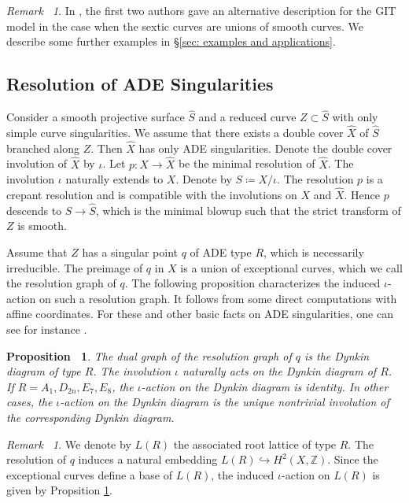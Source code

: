 \documentclass[12pt,reqno,a4paper]{amsart}
\newtheorem{prop}[thm]{Proposition~}
\theoremstyle{remark}
\newtheorem{rmk}[thm]{Remark~}
\theoremstyle{definition}
\begin{document}
\begin{rmk}
In \cite[\S4.2]{yu2023moduli}, the first two authors gave an alternative description for the GIT model in the case when the sextic curves are unions of smooth curves.
We describe some further examples in \S \ref{sec: examples and applications}.
\end{rmk}


\subsection{Resolution of ADE Singularities}
\label{subsection: resolution of ADE}










Consider a smooth projective surface $\widehat{S}$ and a reduced curve $Z\subset \widehat{S}$ with only simple curve singularities.
We assume that there exists a double cover $\widehat{X}$ of $\widehat{S}$ branched along $Z$. Then $\widehat{X}$ has only ADE singularities.
Denote the double cover involution of $\widehat{X}$ by $\iota$. 
Let $p\colon X \to \widehat{X}$ be the minimal resolution of $\widehat{X}$.
The involution $\iota$ naturally extends to $X$.
Denote by $S\coloneqq X/\iota$.
The resolution $p$ is a crepant resolution and is compatible with the involutions on $X$ and $\widehat{X}$. Hence $p$ descends to $S\to \widehat{S}$, which is the minimal blowup such that the strict transform of $Z$ is smooth.


Assume that $Z$ has a singular point $q$ of ADE type $R$, which is necessarily irreducible.
The preimage of $q$ in $X$ is a union of exceptional curves, which we call the resolution graph of $q$. 
The following proposition characterizes the induced $\iota$-action on such a resolution graph. It follows from some direct computations with affine coordinates. For these and other basic facts on ADE singularities, one can see for instance \cite[III, \S 7]{barth2004compact}.
\begin{prop}
\label{prop: iota-action on resolution graph/base}
  The dual graph of the resolution graph of $q$ is the Dynkin diagram of type $R$. 
  The involution $\iota$ naturally acts on the Dynkin diagram of $R$.
  If $R=A_1, D_{2n}, E_7, E_8$, the $\iota$-action on the Dynkin diagram is identity. 
  In other cases, the $\iota$-action on the Dynkin diagram is the unique nontrivial involution of the corresponding Dynkin diagram.
\end{prop}
\begin{rmk}
\label{rmk: iota-action on L(R)}
    We denote by $L(R)$ the associated root lattice of type $R$.
    The resolution of $q$ induces a natural embedding $L(R)\hookrightarrow H^2(X,\mathbb{Z})$.
    Since the exceptional curves define a base of $L(R)$, the induced $\iota$-action on $L(R)$ is given by Propsition \ref{prop: iota-action on resolution graph/base}.
\end{rmk}
\end{document}
